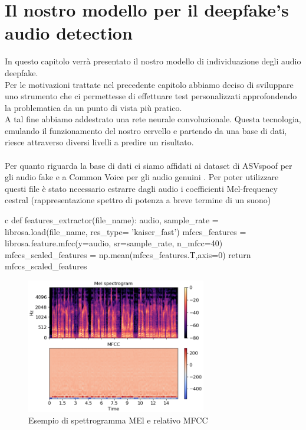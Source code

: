 \documentclass[12pt, a4paper]{article}
\begin{document}
\section{Il nostro modello per il deepfake's audio detection}
In questo capitolo verrà presentato il nostro modello di individuazione degli audio deepfake. \\
Per le motivazioni trattate nel precedente capitolo abbiamo deciso di sviluppare uno strumento che ci permettesse di effettuare test personalizzati approfondendo la problematica da un punto di vista più pratico.\\
A tal fine abbiamo addestrato una rete neurale convoluzionale. Questa tecnologia, emulando il funzionamento del nostro cervello e partendo da una base di dati, riesce attraverso diversi livelli a predire un risultato. \\\\
Per quanto riguarda la base di dati ci siamo affidati ai dataset di ASVspoof per gli audio fake \cite{FakeAudioDataset} e a Common Voice per gli audio genuini \cite{RealAudioDataset}.
Per poter utilizzare questi file è stato necessario estrarre dagli audio i coefficienti Mel-frequency cestral (rappresentazione spettro di potenza a breve termine di un suono)\\
\begin{code}
\label{code:python-code}
\begin{pythoncode}{c}
def features_extractor(file_name):
    audio, sample_rate = librosa.load(file_name, res_type= 'kaiser_fast') 
    mfccs_features = librosa.feature.mfcc(y=audio, sr=sample_rate, n_mfcc=40)
    mfccs_scaled_features = np.mean(mfccs_features.T,axis=0) 
    return mfccs_scaled_features  
\end{pythoncode}
\end{code}
\begin{figure}[h]
    \centering
    \includegraphics[width=0.7\textwidth]{librosa-feature-mfcc-1_00.png}
    \caption{Esempio di spettrogramma MEl e relativo MFCC }
\end{figure} 
\end{document}
